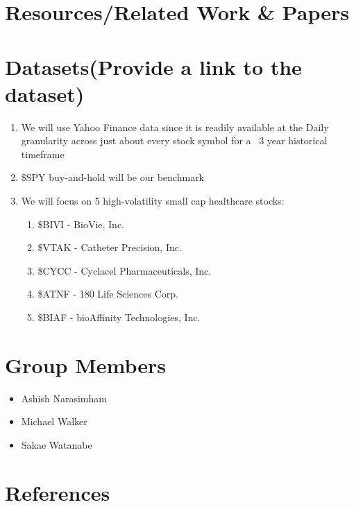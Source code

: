 \documentclass[
	letterpaper, %
]{jdf}
\begin{document}
\section*{Resources/Related Work \& Papers}

\section*{Datasets(Provide a link to the dataset)}

\begin{enumerate}
    \item We will use Yahoo Finance data since it is readily available at the Daily granularity across just about every stock symbol for a ~3 year historical timeframe
    \item \$SPY buy-and-hold will be our benchmark
    \item We will focus on 5 high-volatility small cap healthcare stocks:
    \begin{enumerate}
        \item \$BIVI - BioVie, Inc.
        \item \$VTAK - Catheter Precision, Inc.
        \item \$CYCC - Cyclacel Pharmaceuticals, Inc.
        \item \$ATNF - 180 Life Sciences Corp.
        \item \$BIAF - bioAffinity Technologies, Inc.
    \end{enumerate}
\end{enumerate}


\section*{Group Members}

\begin{itemize}
	\item Ashish Narasimham
	\item Michael Walker
	\item Sakae Watanabe
\end{itemize}

\section{References}

\printbibliography[heading=none]
\end{document}
